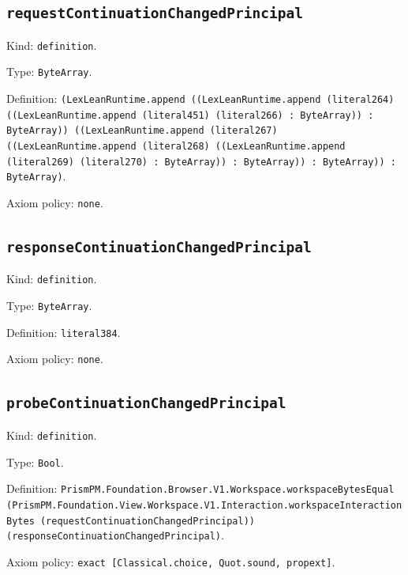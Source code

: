 \documentclass[11pt]{article}
\begin{document}
\subsection*{\texttt{requestContinuationChangedPrincipal}}
\noindent Kind: \texttt{definition}.\par
\noindent Type: \texttt{ByteArray}.\par
\noindent Definition: \texttt{(LexLeanRuntime.append ((LexLeanRuntime.append (literal264) ((LexLeanRuntime.append (literal451) (literal266) : ByteArray)) : ByteArray)) ((LexLeanRuntime.append (literal267) ((LexLeanRuntime.append (literal268) ((LexLeanRuntime.append (literal269) (literal270) : ByteArray)) : ByteArray)) : ByteArray)) : ByteArray)}.\par
\noindent Axiom policy: \texttt{none}.\par
\subsection*{\texttt{responseContinuationChangedPrincipal}}
\noindent Kind: \texttt{definition}.\par
\noindent Type: \texttt{ByteArray}.\par
\noindent Definition: \texttt{literal384}.\par
\noindent Axiom policy: \texttt{none}.\par
\subsection*{\texttt{probeContinuationChangedPrincipal}}
\noindent Kind: \texttt{definition}.\par
\noindent Type: \texttt{Bool}.\par
\noindent Definition: \texttt{PrismPM.Foundation.Browser.V1.Workspace.workspaceBytesEqual (PrismPM.Foundation.View.Workspace.V1.Interaction.workspaceInteractionBytes (requestContinuationChangedPrincipal)) (responseContinuationChangedPrincipal)}.\par
\noindent Axiom policy: \texttt{exact [Classical.choice, Quot.sound, propext]}.\par
\end{document}
